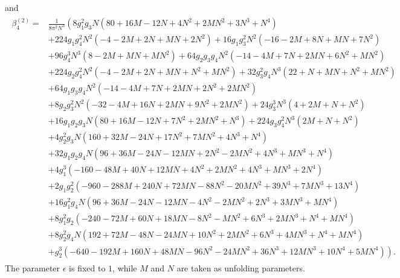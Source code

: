 \documentclass[letterpaper,10pt,english]{jupyterBook}
\begin{document}
\sphinxAtStartPar
and
\begin{equation*}
\begin{split}
\begin{aligned}
\beta_{4}^{(2)}=& \frac{1}{8 \pi^{2} N^{3}}\left(8 g_{1}^{2} g_{3} N\left(80+16 M-12 N+4 N^{2}+2 M N^{2}+3 N^{3}+N^{4}\right)\right.\\
&+224 g_{1} g_{4}^{2} N^{2}\left(-4-2 M+2 N+M N+2 N^{2}\right)+16 g_{1} g_{3}^{2} N^{2}\left(-16-2 M+8 N+M N+7 N^{2}\right) \\
&+96 g_{4}^{3} N^{3}\left(8-2 M+M N+M N^{2}\right)+64 g_{2} g_{3} g_{4} N^{2}\left(-14-4 M+7 N+2 M N+6 N^{2}+M N^{2}\right) \\
&+224 g_{2} g_{4}^{2} N^{2}\left(-4-2 M+2 N+M N+N^{2}+M N^{2}\right)+32 g_{3}^{2} g_{4} N^{3}\left(22+N+M N+N^{2}+M N^{2}\right) \\
&+64 g_{1} g_{3} g_{4} N^{2}\left(-14-4 M+7 N+2 M N+2 N^{2}+2 M N^{2}\right) \\
&+8 g_{2} g_{3}^{2} N^{2}\left(-32-4 M+16 N+2 M N+9 N^{2}+2 M N^{2}\right)+24 g_{3}^{3} N^{3}\left(4+2 M+N+N^{2}\right) \\
&+16 g_{1} g_{2} g_{3} N\left(80+16 M-12 N+7 N^{2}+2 M N^{2}+N^{3}\right)+224 g_{3} g_{4}^{2} N^{3}\left(2 M+N+N^{2}\right) \\
&+4 g_{2}^{2} g_{3} N\left(160+32 M-24 N+17 N^{2}+7 M N^{2}+4 N^{3}+N^{4}\right) \\
&+32 g_{1} g_{2} g_{4} N\left(96+36 M-24 N-12 M N+2 N^{2}-2 M N^{2}+4 N^{3}+M N^{3}+N^{4}\right) \\
&+4 g_{1}^{3}\left(-160-48 M+40 N+12 M N+4 N^{2}+2 M N^{2}+4 N^{3}+M N^{3}+2 N^{4}\right) \\
&+2 g_{1} g_{2}^{2}\left(-960-288 M+240 N+72 M N-88 N^{2}-20 M N^{2}+39 N^{3}+7 M N^{3}+13 N^{4}\right) \\
&+16 g_{1}^{2} g_{4} N\left(96+36 M-24 N-12 M N-4 N^{2}-2 M N^{2}+2 N^{3}+3 M N^{3}+M N^{4}\right) \\
&+8 g_{1}^{2} g_{2}\left(-240-72 M+60 N+18 M N-8 N^{2}-M N^{2}+6 N^{3}+2 M N^{3}+N^{4}+M N^{4}\right) \\
&+8 g_{2}^{2} g_{4} N\left(192+72 M-48 N-24 M N+10 N^{2}+2 M N^{2}+6 N^{3}+4 M N^{3}+N^{4}+M N^{4}\right) \\
&\left.+g_{2}^{3}\left(-640-192 M+160 N+48 M N-96 N^{2}-24 M N^{2}+36 N^{3}+12 M N^{3}+10 N^{4}+5 M N^{4}\right)\right).
\end{aligned}
\end{split}
\end{equation*}
\sphinxAtStartPar
The parameter \(\epsilon\) is fixed to \(1\), while \(M\) and \(N\) are taken
as unfolding parameters.
\end{document}
